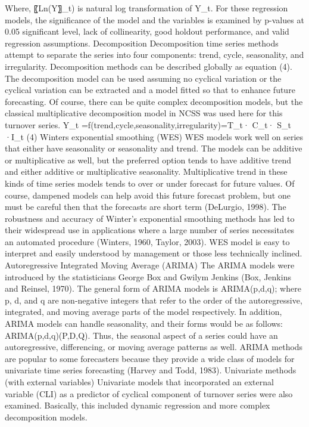 Where, 〖Ln(Y〗_t) is natural log transformation of Y_t. For these regression models, the significance of the model and the variables is examined by p-values at 0.05 significant level, lack of collinearity, good holdout performance, and valid regression assumptions. 
Decomposition 
Decomposition time series methods attempt to separate the series into four components: trend, cycle, seasonality, and irregularity. Decomposition methods can be described globally as equation (4). The decomposition model can be used assuming no cyclical variation or the cyclical variation can be extracted and a model fitted so that to enhance future forecasting. Of course, there can be quite complex decomposition models, but the classical multiplicative decomposition model in NCSS was used here for this turnover series.
Y_t  =f(trend,cycle,seasonality,irregularity)=T_t· C_t· S_t  ·I_t            (4)
Winters exponential smoothing (WES)
WES models work well on series that either have seasonality or seasonality and trend.  The models can be additive or multiplicative as well, but the preferred option tends to have additive trend and either additive or multiplicative seasonality.  Multiplicative trend in these kinds of time series models tends to over or under forecast for future values. Of course, dampened models can help avoid this future forecast problem, but one must be careful then that the forecasts are short term (DeLurgio, 1998). The robustness and accuracy of Winter’s exponential smoothing methods has led to their widespread use in applications where a large number of series necessitates an automated procedure (Winters, 1960, Taylor, 2003). WES model is easy to interpret and easily understood by management or those less technically inclined. 
Autoregressive Integrated Moving Average (ARIMA)
The ARIMA models were introduced by the statisticians George Box and Gwilym Jenkins (Box, Jenkins and Reinsel, 1970). The general form of ARIMA models is ARIMA(p,d,q); where p, d, and q are non-negative integers that refer to the order of the autoregressive, integrated, and moving average parts of the model respectively. In addition, ARIMA models can handle seasonality, and their forms would be as follows: ARIMA(p,d,q)(P,D,Q). Thus, the seasonal aspect of a series could have an autoregressive, differencing, or moving average patterns as well.  ARIMA methods are popular to some forecasters because they provide a wide class of models for univariate time series forecasting (Harvey and Todd, 1983).   
Univariate methods (with external variables)
Univariate models that incorporated an external variable (CLI) as a predictor of cyclical component of turnover series were also examined.  Basically, this included dynamic regression and more complex decomposition models.
